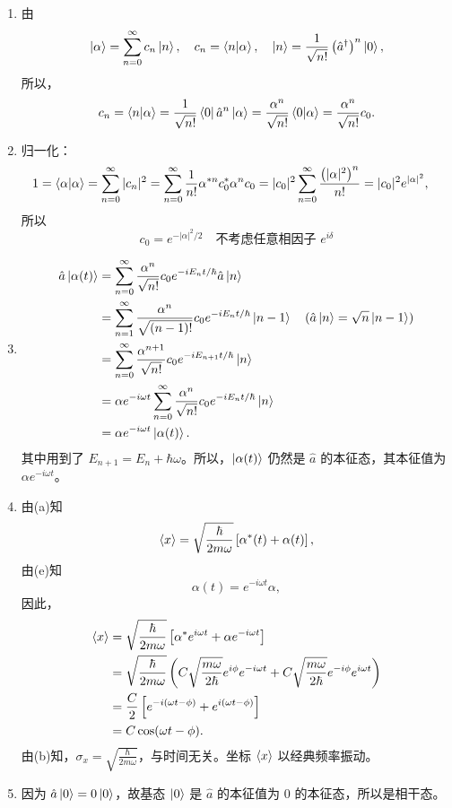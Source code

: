 \begin{enumerate}
	\item[(c)] 由
	\[
	\ket{\alpha} = \sum_{n=0}^{\infty} c_{n}\ket{n}, \quad c_{n} = \bra{n}\ket{\alpha}, \quad \ket{n} = \frac{1}{\sqrt{n!}}\left(\hat{a}^\dagger\right)^{n}\ket{0},
	\]
	所以，
	\[
	c_{n} = \bra{n}\ket{\alpha} = \frac{1}{\sqrt{n!}} \bra{0} \hat{a}^{n} \ket{\alpha} = \frac{\alpha^{n}}{\sqrt{n!}} \bra{0}\ket{\alpha} = \frac{\alpha^{n}}{\sqrt{n!}} c_{0}.
	\]
	
	\item[(d)] 归一化：
	\begin{align*}
		1 &= \bra{\alpha}\ket{\alpha} = \sum_{n=0}^{\infty} |c_{n}|^{2} = \sum_{n=0}^{\infty} \frac{1}{n!} \alpha^{*n} c_{0}^{*} \alpha^{n} c_{0} = |c_{0}|^{2} \sum_{n=0}^{\infty} \frac{\left(|\alpha|^{2}\right)^{n}}{n!} = |c_{0}|^{2} e^{|\alpha|^{2}},
	\end{align*}
	所以
	\[
	c_{0} = e^{-|\alpha|^{2}/2} \quad\text{不考虑任意相因子 $e^{i\delta}$}
	\]
	
	
	\item[(e)]
	\begin{align*}
		\hat{a}\ket{\alpha(t)} &= \sum_{n=0}^{\infty} \frac{\alpha^{n}}{\sqrt{n!}} c_{0} e^{-iE_{n}t/\hbar} \hat{a}\ket{n} \\
		&= \sum_{n=1}^{\infty} \frac{\alpha^{n}}{\sqrt{(n-1)!}} c_{0} e^{-iE_{n}t/\hbar} \ket{n-1} \quad (\hat a\ket{n}=\sqrt{n}\ket{n-1})\\
		&= \sum_{n=0}^{\infty} \frac{\alpha^{n+1}}{\sqrt{n!}} c_{0} e^{-iE_{n+1}t/\hbar} \ket{n} \\
		&= \alpha e^{-i\omega t} \sum_{n=0}^{\infty} \frac{\alpha^{n}}{\sqrt{n!}} c_{0} e^{-iE_{n}t/\hbar} \ket{n} \\
		&= \alpha e^{-i\omega t} \ket{\alpha(t)}.
	\end{align*}
	其中用到了 $E_{n+1} = E_{n} + \hbar\omega$。所以，$\ket{\alpha(t)}$ 仍然是 $\hat{a}$ 的本征态，其本征值为 $\alpha e^{-i\omega t}$。
	
	\item[(f)] 由(a)知
	\[
	\expval{x} = \sqrt{\frac{\hbar}{2m\omega}} \left[ \alpha^{*}(t) + \alpha(t) \right],
	\]
	由(e)知
	\[
	\alpha(t) = e^{-i\omega t} \alpha,
	\]
	因此，
	\begin{align*}
		\expval{x} &= \sqrt{\frac{\hbar}{2m\omega}} \left[ \alpha^{*} e^{i\omega t} + \alpha e^{-i\omega t} \right] \\
		&= \sqrt{\frac{\hbar}{2m\omega}} \left( C\sqrt{\frac{m\omega}{2\hbar}} e^{i\phi} e^{-i\omega t} + C\sqrt{\frac{m\omega}{2\hbar}} e^{-i\phi} e^{i\omega t} \right) \\
		&= \frac{C}{2} \left[ e^{-i(\omega t - \phi)} + e^{i(\omega t - \phi)} \right] \\
		&= C \cos(\omega t - \phi).
	\end{align*}
	由(b)知，$\sigma_{x} = \sqrt{\frac{\hbar}{2m\omega}}$，与时间无关。坐标 $\expval{x}$ 以经典频率振动。
	
	\item[(g)] 因为 $\hat{a}\ket{0} = 0\ket{0}$，故基态 $\ket{0}$ 是 $\hat{a}$ 的本征值为 $0$ 的本征态，所以是相干态。
\end{enumerate}